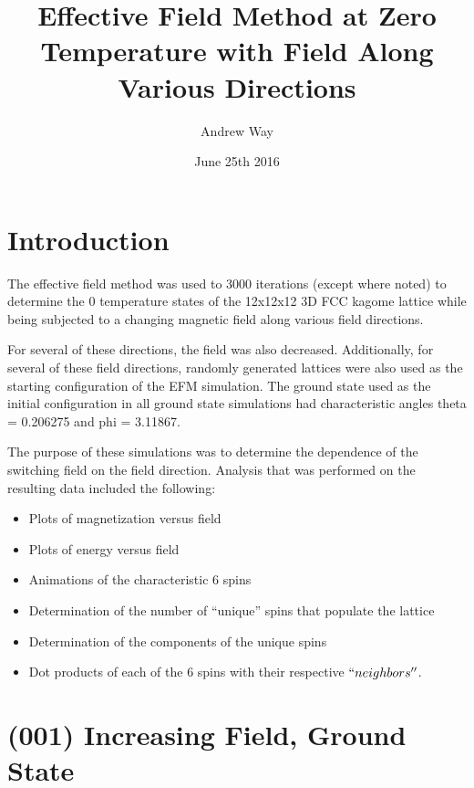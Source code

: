 \documentclass{article}
\title{Effective Field Method at Zero Temperature with Field Along Various Directions}
\author{Andrew Way}
\date{June 25th 2016}
\begin{document}
\maketitle

\tableofcontents

\clearpage
\section{Introduction}
    The effective field method was used to 3000 iterations (except where noted) to determine the 0 temperature states of 
    the 12x12x12 3D FCC kagome lattice while being subjected to a changing magnetic field along various field
    directions. 
    
    For several of these directions, the field was also decreased. Additionally, for several of these
    field directions, randomly generated lattices were also used as the starting configuration of the EFM simulation. The
    ground state used as the initial configuration in all ground state simulations had characteristic angles theta = 0.206275 and phi = 3.11867.
    
    The purpose of these simulations was to determine the dependence of the switching field on the field direction.
    Analysis that was performed on the resulting data included the following:
    \begin{itemize}
     \item Plots of magnetization versus field
     \item Plots of energy versus field
     \item Animations of the characteristic 6 spins 
     \item Determination of the number of ``unique'' spins that populate the lattice
     \item Determination of the components of the unique spins
     \item Dot products of each of the 6 spins with their respective $``neighbors''$.  
    \end{itemize}
\clearpage
\section{(001) Increasing Field, Ground State}
\end{document}
